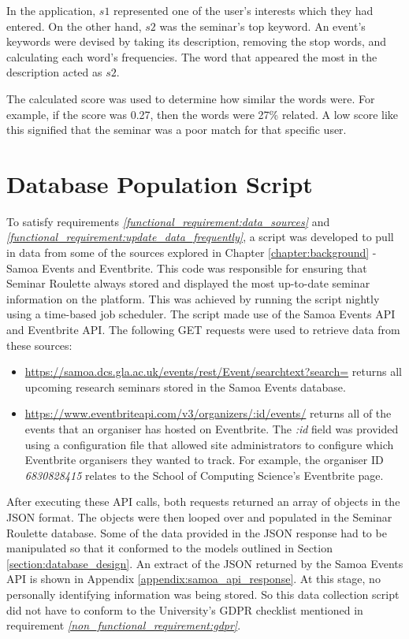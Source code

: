 \documentclass{l4proj}
\begin{document}
In the application, $s1$ represented one of the user's interests which they had entered. On the other hand, $s2$ was the seminar's top keyword. An event's keywords were devised by taking its description, removing the stop words, and calculating each word's frequencies. The word that appeared the most in the description acted as $s2$. 

The calculated score was used to determine how similar the words were. For example, if the score was 0.27, then the words were 27\% related. A low score like this signified that the seminar was a poor match for that specific user.

\section{Database Population Script}
\label{section:database_population_script}

To satisfy requirements \emph{\ref{functional_requirement:data_sources}} and \emph{\ref{functional_requirement:update_data_frequently}}, a script was developed to pull in data from some of the sources explored in Chapter \ref{chapter:background} - Samoa Events and Eventbrite. This code was responsible for ensuring that Seminar Roulette always stored and displayed the most up-to-date seminar information on the platform. This was achieved by running the script nightly using a time-based job scheduler. The script made use of the Samoa Events API and Eventbrite API. The following GET requests were used to retrieve data from these sources:

\begin{itemize}
    \item \url{https://samoa.dcs.gla.ac.uk/events/rest/Event/searchtext?search=} returns all upcoming research seminars stored in the Samoa Events database.
    \item \url{https://www.eventbriteapi.com/v3/organizers/:id/events/} returns all of the events that an organiser has hosted on Eventbrite. The \emph{:id} field was provided using a configuration file that allowed site administrators to configure which Eventbrite organisers they wanted to track. For example, the organiser ID \emph{6830828415} relates to the School of Computing Science's Eventbrite page.
\end{itemize}

After executing these API calls, both requests returned an array of objects in the JSON format. The objects were then looped over and populated in the Seminar Roulette database. Some of the data provided in the JSON response had to be manipulated so that it conformed to the models outlined in Section \ref{section:database_design}. An extract of the JSON returned by the Samoa Events API is shown in Appendix \ref{appendix:samoa_api_response}. At this stage, no personally identifying information was being stored. So this data collection script did not have to conform to the University's GDPR checklist mentioned in requirement \emph{\ref{non_functional_requirement:gdpr}}.
\end{document}
